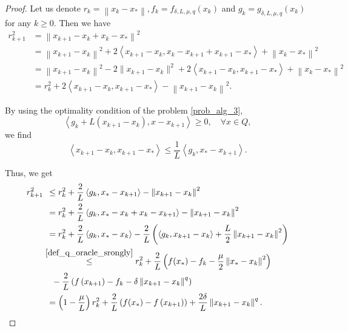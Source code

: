\documentclass[11pt]{amsart}
\theoremstyle{definition}
\numberwithin{equation}{section}
\begin{document}
\begin{proof}
Let us denote $r_k = \left\|x_k - x_*\right\|, f_k = f_{\delta, L, \mu, q} (x_k)$ and $g_k = g_{\delta, L, \mu, q} (x_k)$ for any $k \geq 0$. Then we have 
\begin{align*}
    r_{k+1}^2 & = \left \|x_{k+1} - x_k + x_k- x_*\right \|^2
    \\& = \left\|x_{k+1} - x_k\right\|^2 + 2 \left\langle  x_{k+1} - x_k, x_k - x_{k+1} + x_{k+1} - x_*\right\rangle + \left \|x_k- x_*\right\|^2
    \\& = \left\|x_{k+1} - x_k\right\|^2 - 2 \|x_{k+1} - x_k\|^2 + 2 \left\langle  x_{k+1} - x_k, x_{k+1}  - x_*\right\rangle +\left \|x_{k} - x_*\right\|^2 
    \\& = r_k^2 + 2 \left\langle  x_{k+1} - x_k, x_{k+1}  - x_*\right\rangle - \left\|x_{k+1} - x_k\right\|^2.
\end{align*}

By using the optimality condition of the problem \eqref{prob_alg_3},
\[
    \left\langle g_k + L(x_{k+1} - x_k) ,  x - x_{k+1}\right\rangle \geq 0, \quad \forall x \in Q,
\]
we find 
\[
    \left\langle x_{k+1} - x_k , x_{k+1}  - x_* \right\rangle  \leq \frac{1}{L} \left\langle g_k,  x_* - x_{k+1}\right\rangle . 
\]

Thus, we get 
\begin{align*}
    r_{k+1}^2 & \; \, \leq r_k^2 + \frac{2}{L} \left\langle g_k,  x_* - x_{k+1}\right\rangle  - \left\|x_{k+1} - x_k\right\|^2
    \\&\; \, =  r_k^2 + \frac{2}{L} \left\langle g_k,  x_* -  x_k + x_k - x_{k+1}\right\rangle  - \left\|x_{k+1} - x_k\right\|^2
    \\&\; \, = r_k^2 +  \frac{2}{L} \left\langle g_k,  x_* -  x_k \right\rangle -  \frac{2}{L} \left( \left\langle g_k,  x_{k+1} -  x_k \right\rangle  + \frac{L}{2}\left\|x_{k+1} - x_k\right\|^2  \right)
    \\& \stackrel{\eqref{def_q_oracle_srongly}}{\leq} r_k^2 +  \frac{2}{L} \left(f(x_*) - f_k - \frac{\mu}{2} \left\|x_* - x_k\right\|^2\right) 
    \\& \quad - \frac{2}{L} \left(f\left(x_{k+1}\right) - f_k - \delta \left\|x_{k+1} - x_k \right \|^q\right)
    \\&\; \, =  \left( 1 - \frac{\mu}{L}\right) r_k^2 + \frac{2}{L} \left(f(x_*) - f\left(x_{k+1}\right) \right) + \frac{2\delta }{L} \left  \|x_{k+1} - x_k\right \|^q. 
\end{align*}


\end{proof}
\end{document}
